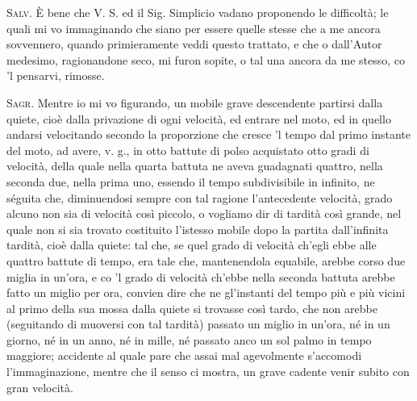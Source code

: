 \documentclass[11pt,twoside,openany]{book}
\newcommand{\speaker}[1]{\textcolor{rubric}{\textsc{#1}}\space}
\begin{document}
\speaker{Salv.} È bene che V. S. ed il Sig. Simplicio vadano proponendo le difficoltà; le quali mi vo immaginando che siano per essere quelle stesse che a me ancora sovvennero, quando primieramente veddi questo trattato, e che o dall'Autor medesimo, ragionandone seco, mi furon sopite, o tal una ancora da me stesso, co 'l pensarvi, rimosse.

\speaker{Sagr.} Mentre io mi vo figurando, un mobile grave descendente partirsi dalla quiete, cioè dalla privazione di ogni velocità, ed entrare nel moto, ed in quello andarsi velocitando secondo la proporzione che cresce 'l tempo dal primo instante del moto, ad avere, v. g., in otto battute di polso acquistato otto gradi di velocità, della quale nella quarta battuta ne aveva guadagnati quattro, nella seconda due, nella prima uno, essendo il tempo subdivisibile in infinito, ne séguita che, diminuendosi sempre con tal ragione l'antecedente velocità, grado alcuno non sia di velocità così piccolo, o vogliamo dir di tardità così grande, nel quale non si sia trovato costituito l'istesso mobile dopo la partita dall'infinita tardità, cioè dalla quiete: tal che, se quel grado di velocità ch'egli ebbe alle quattro battute di tempo, era tale che, mantenendola equabile, arebbe corso due miglia in un'ora, e co 'l grado di velocità ch'ebbe nella seconda battuta arebbe fatto un miglio per ora, convien dire che ne gl'instanti del tempo più e più vicini al primo della sua mossa dalla quiete si trovasse così tardo, che non arebbe (seguitando di muoversi con tal tardità) passato un miglio in un'ora, né in un giorno, né in un anno, né in mille, né passato anco un sol palmo in tempo maggiore; accidente al quale pare che assai mal agevolmente s'accomodi l'immaginazione, mentre che il senso ci mostra, un grave cadente venir subito con gran velocità.
\end{document}

